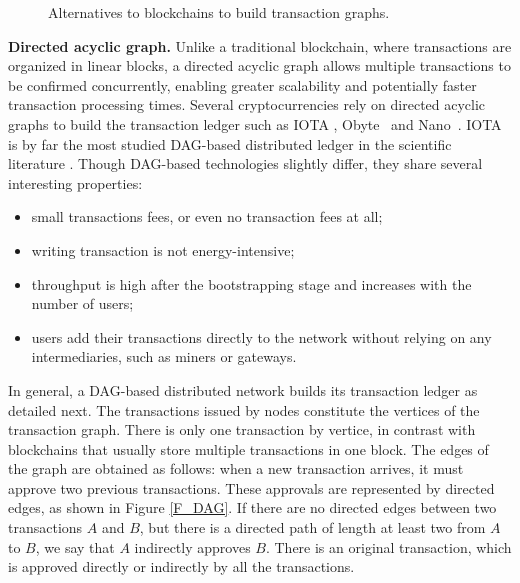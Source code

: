 \begin{figure}
       \caption{Alternatives to blockchains to build transaction graphs.}
       \label{F_alternative_DLT}
\end{figure} 


 \textbf{Directed acyclic graph.} Unlike a traditional blockchain, where transactions are organized in linear blocks, a directed acyclic graph allows multiple transactions to be confirmed concurrently, 
 enabling greater scalability and potentially faster transaction processing times. Several cryptocurrencies rely on directed acyclic graphs to build the transaction ledger
 such as IOTA \cite{Popov2017}, Obyte~\cite{Churyumov2017} and Nano~\cite{LeMahieu2017}. IOTA is by far the most studied DAG-based distributed 
 ledger in the scientific literature \cite{Conti2022, Carelli2022, Guo2023, Naresh2023}.
 Though DAG-based technologies slightly differ, they share several interesting properties:
 \begin{itemize}
    \item small transactions fees, or even no transaction fees at all;
    \item writing transaction is not energy-intensive;
    \item throughput is high after the bootstrapping stage and increases with the number of users;
    \item users add their transactions directly to the network without relying on any intermediaries, such 
    as miners or gateways.
 \end{itemize}

In general, a DAG-based distributed network builds its transaction ledger as detailed next. The transactions
issued by nodes constitute the vertices of the transaction graph. There is only one transaction by vertice, in 
contrast with blockchains that usually store multiple transactions in one block. The edges of the graph are obtained as follows:
when a new transaction arrives, it must approve two previous transactions. These
approvals are represented by directed edges, as shown in Figure \ref{F_DAG}. If there are no
directed edges between two transactions $A$ and $B$, but there is a directed
path of length at least two from $A$ to $B$, we say that $A$ indirectly approves $B$.
There is an original transaction, which is approved directly or indirectly by all the transactions.
 
